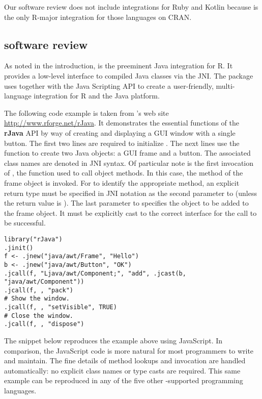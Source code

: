 Our software review does not include integrations for Ruby and Kotlin because  is the only R-major integration for those languages on CRAN.

\hypertarget{rjava-software-review}{}
\subsection{ software review}

As noted in the introduction,  is the preeminent Java integration for R. It provides a low-level interface to compiled Java classes via the JNI. The  package uses  together with the Java Scripting API to create a user-friendly, multi-language integration for R and the Java platform.

The following code example is taken from 's web site \url{http://www.rforge.net/rJava}. It demonstrates the essential functions of the \textbf{rJava} API by way of creating and displaying a GUI window with a single button. The first two lines are required to initialize . The next lines use the  function to create two Java objects: a GUI frame and a button. The associated class names are denoted in JNI syntax. Of particular note is the first invocation of , the function used to call object methods. In this case, the  method of the frame object is invoked. For  to identify the appropriate method, an explicit return type must be specified in JNI notation as the second parameter to  (unless the return value is ). The last parameter to  specifies the object to be added to the frame object. It must be explicitly cast to the correct interface for the call to be successful.

\begin{verbatim}
library("rJava")
.jinit()
f <- .jnew("java/awt/Frame", "Hello")
b <- .jnew("java/awt/Button", "OK")
.jcall(f, "Ljava/awt/Component;", "add", .jcast(b, "java/awt/Component"))
.jcall(f, , "pack")
# Show the window.
.jcall(f, , "setVisible", TRUE)
# Close the window.
.jcall(f, , "dispose")
\end{verbatim}

The snippet below reproduces the  example above using JavaScript. In comparison, the JavaScript code is more natural for most programmers to write and maintain. The fine details of method lookups and invocation are handled automatically: no explicit class names or type casts are required. This same example can be reproduced in any of the five other -supported programming languages.


